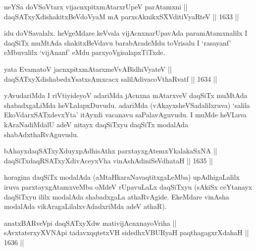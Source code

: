 \begin{shl}
neYSa doVSoV\s tarx vijacnxpitxmAtarxrUpeV parAtamxni || \\
daqSATxyXdishakitxBeVdoV\s yaM mA parxsAknikxSXVditiVyaRteV \hfill || 1633 ||  
\end{shl}

\begin{artha}
idu doVSavalalx. heVgeMdare keVvala vijAcnxnarUpavAda paramAtamxnalilx I daqSiTx muMtAda shakitxBeVdavu barabAradeMdu toVrisalu I `rasayanf' eMbuvalilx `vijAnanf' eMdu parxyoVgisalapxTiTxde.
\end{artha}

\begin{shl}
yata EvamatoV jacnxpitxmAtarxmeVvABidhiVyateV ||  \\
daqSATxyXdishabedxYsatxsAmxcacx salilAdivacoV\s thaRvatf \hfill || 1634 ||  
\end{shl}

\begin{artha}
yAvudariMda I riVtiyideyoV adariMda jAcnxna mAtarxveV daqSiTx muMtAda shabadxgaLiMda heVLalapxDuvudu. adariMda (vAkayxsheVSadalilxruva) `salila EkoVdarxSATx\s devxYta' itAyxdi vacanavu saPalavAguvudu. I muMde heVLuva kAraNadiMdalU adeV nitayx daqSiTxyu daqSiTx modalAda shabAdxthaRvAguvudu.
\end{artha}

\begin{shl}
\footnotemark[1]bAhayxdaqSATxyXduyxpAdhisAthx parxtayxgAtemxYkalakaSxNA || \\
daqSiTxdaqRSATxyXdivAceyxVha vinAshAdiniSeVdhataH \hfill || 1635 ||  
\end{shl}

\begin{artha}
horagina daqSiTx modalAda (aMtaHkaraNavaqtitxgaLeMba) upAdhigaLalilx iruva parxtayxgAtamxveMba oMdeV rUpavuLaLx daqSiTxyu (sAkiSx ceYtanayx daqSiTxyu ililx modalAda shabadxgaLa athaRvAgide. EkeMdare vinAsha modalAda vikAragaLilalxvAdadxriMda adeV athaR).
\end{artha}


\begin{shl}
anatxBARveV\s pi daqSATxyXdw mativijAcnxnayoVriha || \\
sAvxtaterxyXVNApi tadavxqqtetxVH sidedhxVBURyaH paqthagagxrXdahaH \hfill || 1636 ||  
\end{shl}

